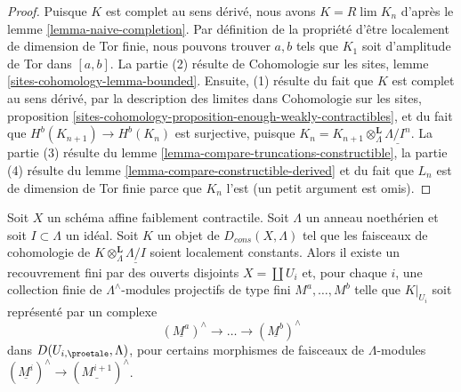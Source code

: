 \begin{proof}
Puisque $K$ est complet au sens dérivé, nous avons $K = R\lim K_n$ d'après le
lemme \ref{lemma-naive-completion}.
Par définition de la propriété d'être localement de dimension de Tor finie, nous pouvons trouver
$a, b$ tels que $K_1$ soit d'amplitude de Tor dans $[a, b]$.
La partie (2) résulte de
Cohomologie sur les sites, lemme \ref{sites-cohomology-lemma-bounded}.
Ensuite, (1) résulte du fait que $K$ est complet au sens dérivé, par la description
des limites dans
Cohomologie sur les sites, proposition
\ref{sites-cohomology-proposition-enough-weakly-contractibles},
et du fait que $H^b(K_{n + 1}) \to H^b(K_n)$ est surjective,
puisque $K_n = K_{n + 1} \otimes^\mathbf{L}_\Lambda \underline{\Lambda/I^n}$.
La partie (3) résulte du
lemme \ref{lemma-compare-truncations-constructible},
la partie (4) résulte du
lemme \ref{lemma-compare-constructible-derived}
et du fait que $L_n$ est de dimension de Tor finie parce que $K_n$ l'est
(un petit argument est omis).
\end{proof}

\begin{lemma}
\label{lemma-local-structure-constructible-complex}
Soit $X$ un schéma affine faiblement contractile. Soit $\Lambda$ un
anneau noethérien et soit $I \subset \Lambda$ un idéal. Soit $K$ un objet de
$D_{cons}(X, \Lambda)$ tel que les faisceaux de cohomologie de
$K \otimes_\Lambda^\mathbf{L} \underline{\Lambda/I}$ soient localement
constants. Alors il existe un recouvrement fini par des ouverts disjoints
$X = \coprod U_i$ et, pour chaque $i$, une collection finie de
$\Lambda^\wedge$-modules projectifs de type fini $M^a, \ldots, M^b$
telle que $K|_{U_i}$ soit représenté par un complexe
$$
(\underline{M^a})^\wedge \to \ldots \to (\underline{M^b})^\wedge
$$
dans $D(U_{i, \proetale}, \Lambda)$, pour certains morphismes de faisceaux de
$\Lambda$-modules $(\underline{M^i})^\wedge \to (\underline{M^{i + 1}})^\wedge$.
\end{lemma}

